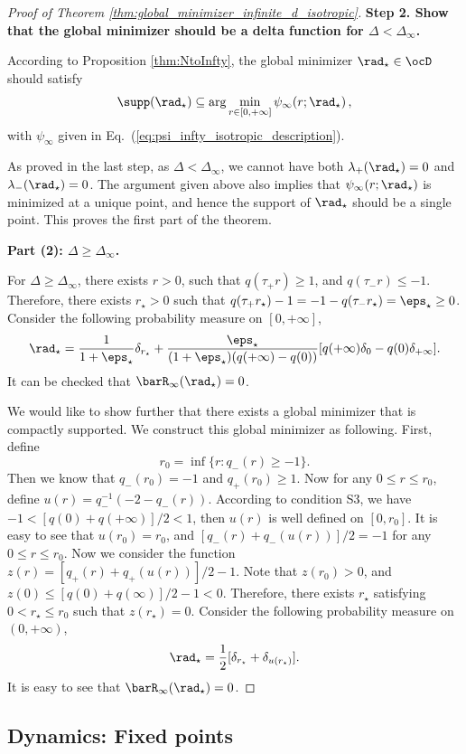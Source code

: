 \documentclass[11pt]{article}
\begin{document}
\begin{proof}[Proof of Theorem \ref{thm:global_minimizer_infinite_d_isotropic}]
\noindent
{\bf Step 2. Show that the global minimizer should be a delta function for $\Delta < \Delta_\infty$. } 


According to Proposition \ref{thm:NtoInfty}, the global minimizer $\rad_\star \in \ocD$ should satisfy
\[
\supp(\rad_\star) \subseteq \arg\min_{r \in [0, +\infty]}
\psi_\infty(r; \rad_\star)\, ,
\]
with $\psi_\infty$ given in Eq.~(\ref{eq:psi_infty_isotropic_description}). 


As proved in the last step, as $\Delta < \Delta_\infty$, we cannot have both $\lambda_+(\rad_\star) = 0$ and $\lambda_-(\rad_\star) = 0$. The argument
given above also implies that $\psi_\infty(r; \rad_\star)$ is minimized at a unique point, and hence the support of $\rad_\star$ should be
a single point. This proves the first part of the theorem. 

\noindent
{\bf Part (2): $\Delta \ge \Delta_\infty$. }

For $\Delta \ge \Delta_\infty$, there exists $r > 0$, such that $q(\tau_+ r) \ge 1$, and $q(\tau_- r) \le -1$. Therefore, there exists $r_\star > 0$ such that $q(\tau_+ r_\star) -1 = -1 - q(\tau_- r_\star) = \eps_\star \ge 0$. Consider the following probability measure on $[0, +\infty]$, 
\[
\rad_\star = \frac{1}{1 + \eps_\star} \delta_{r_\star} +\frac{\eps_\star}{(1 + \eps_\star)(q(+\infty) - q(0))}  [ q(+\infty)\delta_0 - q(0) \delta_{+\infty}].
\]
It can be checked that $\barR_\infty(\rad_\star) = 0$. 

We would like to show further that there exists a global minimizer that is compactly supported. We construct this global minimizer as following. First, define 
\[
r_0 = \inf\{r: q_-(r) \ge -1 \}. 
\]
Then we know that $q_-(r_0) = -1$ and $q_+(r_0) \ge 1$. Now for any $0 \le r \le r_0$, define $u(r) = q_-^{-1}(-2 - q_-(r))$. According to condition {\sf S3}, we have $-1 < [q(0) + q(+\infty)] /2 < 1$, then $u(r)$ is well defined on $[0, r_0]$. It is easy to see that $u(r_0) = r_0$, and $[q_-(r) + q_-(u(r))]/2 = -1$ for any $0 \le r \le r_0$. Now we consider the function $z(r) = [q_+(r) + q_+(u(r))]/2 - 1$. Note that $z(r_0) > 0$, and $z(0) \le [q(0) + q(\infty)]/2 - 1 < 0$. Therefore, there exists $r_\star$ satisfying $0 < r_\star \le r_0$ such that $z(r_\star) = 0$. Consider the following probability measure on $(0, +\infty)$, 
\[
\rad_\star = \frac{1}{2} [\delta_{r_\star} + \delta_{u(r_\star)}]. 
\]
It is easy to see that $\barR_\infty(\rad_\star) = 0$. 
\end{proof}


\subsection{Dynamics: Fixed points}
\end{document}

